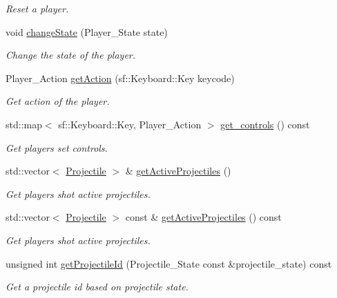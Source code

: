 \begin{DoxyCompactItemize}
\begin{DoxyCompactList}\small\item\em Reset a player. \end{DoxyCompactList}\item 
void \hyperlink{classPlayer_aa83d815158b15b6847b36c8d3473b371}{change\+State} (Player\+\_\+\+State state)
\begin{DoxyCompactList}\small\item\em Change the state of the player. \end{DoxyCompactList}\item 
Player\+\_\+\+Action \hyperlink{classPlayer_a7c1ccd08bb0263db78641f4397d5f158}{get\+Action} (sf\+::\+Keyboard\+::\+Key keycode)
\begin{DoxyCompactList}\small\item\em Get action of the player. \end{DoxyCompactList}\item 
std\+::map$<$ sf\+::\+Keyboard\+::\+Key, Player\+\_\+\+Action $>$ \hyperlink{classPlayer_af6527c6b10c6c421b07064db039c03e6}{get\+\_\+controls} () const
\begin{DoxyCompactList}\small\item\em Get player\textquotesingle{}s set controls. \end{DoxyCompactList}\item 
std\+::vector$<$ \hyperlink{classProjectile}{Projectile} $>$ \& \hyperlink{classPlayer_a0e8dc2d397dc0a6e3634cb32a01ff4cb}{get\+Active\+Projectiles} ()
\begin{DoxyCompactList}\small\item\em Get player\textquotesingle{}s shot active projectiles. \end{DoxyCompactList}\item 
std\+::vector$<$ \hyperlink{classProjectile}{Projectile} $>$ const  \& \hyperlink{classPlayer_a7593094855014964596dd9d8e6347ae6}{get\+Active\+Projectiles} () const
\begin{DoxyCompactList}\small\item\em Get player\textquotesingle{}s shot active projectiles. \end{DoxyCompactList}\item 
unsigned int \hyperlink{classPlayer_a46eff785fb376112059c90a137ac25f7}{get\+Projectile\+Id} (Projectile\+\_\+\+State const \&projectile\+\_\+state) const
\begin{DoxyCompactList}\small\item\em Get a projectile id based on projectile state. \end{DoxyCompactList}\item 

\end{DoxyCompactItemize}
